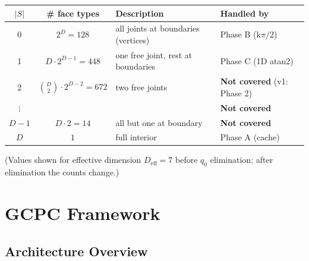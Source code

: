 \documentclass[11pt,a4paper]{article}
\begin{document}
\begin{center}
\begin{tabular}{c|c|l|l}
\toprule
$|S|$ & \# face types & Description & Handled by \\
\midrule
0     & $2^D = 128$   & all joints at boundaries (vertices) & Phase B (k$\pi/2$) \\
1     & $D\cdot 2^{D-1} = 448$ & one free joint, rest at boundaries & Phase C (1D atan2) \\
2     & $\binom{D}{2}\cdot 2^{D-2} = 672$ & two free joints & \textbf{Not covered} (v1: Phase 2) \\
$\vdots$ & & & \textbf{Not covered} \\
$D-1$ & $D\cdot 2 = 14$ & all but one at boundary & \textbf{Not covered} \\
$D$   & $1$             & full interior & Phase A (cache) \\
\bottomrule
\end{tabular}
\end{center}

(Values shown for effective dimension $D_\text{eff} = 7$ before $q_0$
elimination; after elimination the counts change.)


\section{GCPC Framework}\label{sec:gcpc}

\subsection{Architecture Overview}
\end{document}
